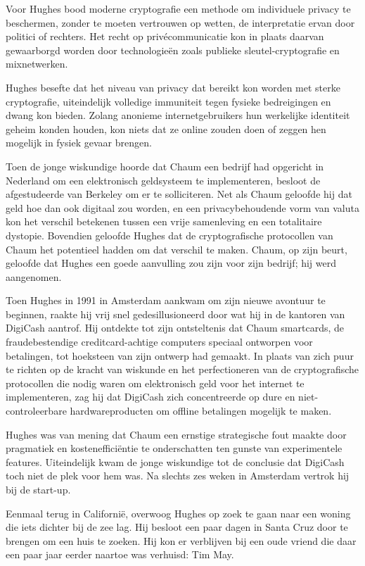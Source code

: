 \documentclass[
  a5paper,
  smalldemyvopaper,11pt,twoside,onecolumn,openright,extrafontsizes]{memoir}
\begin{document}
Voor Hughes bood moderne cryptografie een methode om individuele privacy
te beschermen, zonder te moeten vertrouwen op wetten, de interpretatie
ervan door politici of rechters. Het recht op privécommunicatie kon in
plaats daarvan gewaarborgd worden door technologieën zoals publieke
sleutel-cryptografie en mixnetwerken.

Hughes besefte dat het niveau van privacy dat bereikt kon worden met
sterke cryptografie, uiteindelijk volledige immuniteit tegen fysieke
bedreigingen en dwang kon bieden. Zolang anonieme internetgebruikers hun
werkelijke identiteit geheim konden houden, kon niets dat ze online
zouden doen of zeggen hen mogelijk in fysiek gevaar brengen.

Toen de jonge wiskundige hoorde dat Chaum een bedrijf had opgericht in
Nederland om een elektronisch geldsysteem te implementeren, besloot de
afgestudeerde van Berkeley om er te solliciteren. Net als Chaum geloofde
hij dat geld hoe dan ook digitaal zou worden, en een privacybehoudende
vorm van valuta kon het verschil betekenen tussen een vrije samenleving
en een totalitaire dystopie. Bovendien geloofde Hughes dat de
cryptografische protocollen van Chaum het potentieel hadden om dat
verschil te maken. Chaum, op zijn beurt, geloofde dat Hughes een goede
aanvulling zou zijn voor zijn bedrijf; hij werd aangenomen.

Toen Hughes in 1991 in Amsterdam aankwam om zijn nieuwe avontuur te
beginnen, raakte hij vrij snel gedesillusioneerd door wat hij in de
kantoren van DigiCash aantrof. Hij ontdekte tot zijn ontsteltenis dat
Chaum smartcards, de fraudebestendige creditcard-achtige computers
speciaal ontworpen voor betalingen, tot hoeksteen van zijn ontwerp had
gemaakt. In plaats van zich puur te richten op de kracht van wiskunde en
het perfectioneren van de cryptografische protocollen die nodig waren om
elektronisch geld voor het internet te implementeren, zag hij dat
DigiCash zich concentreerde op dure en niet-controleerbare
hardwareproducten om offline betalingen mogelijk te maken.

Hughes was van mening dat Chaum een ernstige strategische fout maakte
door pragmatiek en kostenefficiëntie te onderschatten ten gunste van
experimentele features. Uiteindelijk kwam de jonge wiskundige tot de
conclusie dat DigiCash toch niet de plek voor hem was. Na slechts zes
weken in Amsterdam vertrok hij bij de start-up.

Eenmaal terug in Californië, overwoog Hughes op zoek te gaan naar een
woning die iets dichter bij de zee lag. Hij besloot een paar dagen in
Santa Cruz door te brengen om een huis te zoeken. Hij kon er verblijven
bij een oude vriend die daar een paar jaar eerder naartoe was verhuisd:
Tim May.
\end{document}

